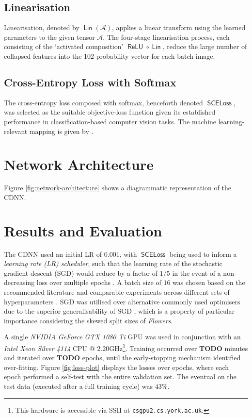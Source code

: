\documentclass[journal]{IEEEtran}
\newcommand\networkperformance{43}
\DeclareMathOperator\relu{\mathsf{ReLU}}
\DeclareMathOperator\linear{\mathsf{Lin}}
\DeclareMathOperator\loss{\mathsf{SCELoss}}
\begin{document}
\subsection{Linearisation}
Linearisation, denoted by $\linear(\mathcal{A})$, applies a linear transform
using the learned parameters to the given tensor $\mathcal{A}$. The four-stage
linearisation process, each consisting of the `activated composition' $\relu
\circ \linear$, reduce the large number of collapsed features into the
102-probability vector for each batch image.

\subsection{Cross-Entropy Loss with Softmax}
The cross-entropy loss composed with softmax, henceforth denoted $\loss$, was
selected as the suitable objective-loss function given its established
performance in classification-based computer vision tasks. The machine
learning-relevant mapping is given by \cite{Jie:2018}.

\section{Network Architecture}
Figure \ref{fig:network-architecture} shows a diagrammatic representation of the
CDNN.

\section{Results and Evaluation}
The CDNN used an initial LR of $0.001$, with $\loss$ being used to inform a
\emph{learning rate (LR) scheduler}, such that the learning rate of the
stochastic gradient descent (SGD) would reduce by a factor of $1/5$ in the event
of a non-decreasing loss over multiple epochs \cite{Konar:2020}. A batch size of
$16$ was chosen based on the recommended literature and comparable experiments
across different sets of hyperparameters \cite{Kandel:2020}. SGD was utilised
over alternative commonly used optimisers due to the superior generalisability
of SGD \cite{Hardt:2016}, which is a property of particular importance
considering the skewed split sizes of \emph{Flowers}.

A single \emph{NVIDIA GeForce GTX 1080 Ti} GPU was used in conjunction with an
\emph{Intel Xeon Silver 4114} CPU @ $2.20$GHz\footnote{This hardware is
accessible via SSH at \texttt{csgpu2.cs.york.ac.uk}.}. Training occurred over
\textbf{TODO} minutes and iterated over \textbf{TODO} epochs, until the
early-stopping mechanism identified over-fitting. Figure \ref{fig:loss-plot}
displays the losses over epochs, where each epoch performed a self-test with the
entire validation set.  The eventual on the test data (executed after a full
training cycle) was $\networkperformance$\%.
\end{document}

